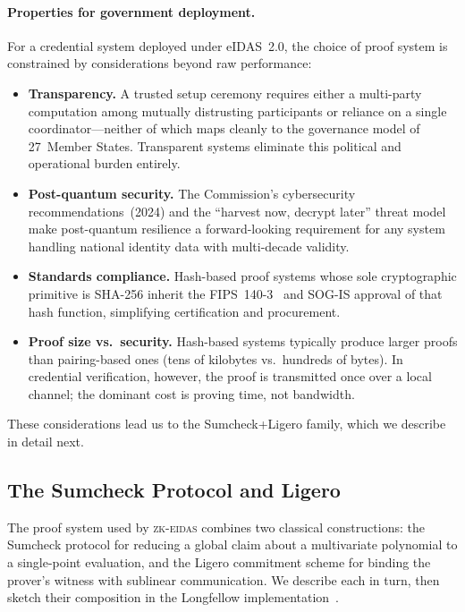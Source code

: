 \paragraph{Properties for government deployment.}
For a credential system deployed under eIDAS~2.0, the choice of proof system is
constrained by considerations beyond raw performance:
\begin{itemize}
  \item \textbf{Transparency.}  A trusted setup ceremony requires either a
        multi-party computation among mutually distrusting participants or
        reliance on a single coordinator---neither of which maps cleanly to the
        governance model of 27~Member States.  Transparent systems eliminate
        this political and operational burden entirely.
  \item \textbf{Post-quantum security.}  The Commission's cybersecurity
        recommendations~(2024) and the ``harvest now, decrypt later'' threat model
        make post-quantum resilience a forward-looking requirement for any
        system handling national identity data with multi-decade validity.
  \item \textbf{Standards compliance.}  Hash-based proof systems whose sole
        cryptographic primitive is SHA-256 inherit the FIPS~140-3~\cite{fips140}
        and SOG-IS approval of that hash function, simplifying certification
        and procurement.
  \item \textbf{Proof size vs.\ security.}  Hash-based systems typically
        produce larger proofs than pairing-based ones (tens of kilobytes
        vs.\ hundreds of bytes).  In credential verification, however, the
        proof is transmitted once over a local channel; the dominant cost is
        proving time, not bandwidth.
\end{itemize}
These considerations lead us to the Sumcheck+Ligero family, which we describe
in detail next.

\subsection{The Sumcheck Protocol and Ligero}\label{sec:bg-sumcheck-ligero}

The proof system used by \textsc{zk-eidas} combines two classical
constructions: the Sumcheck protocol for reducing a global claim about a
multivariate polynomial to a single-point evaluation, and the Ligero
commitment scheme for binding the prover's witness with sublinear
communication.  We describe each in turn, then sketch their composition in the
Longfellow implementation~\cite{longfellow,longfellow-ietf}.

